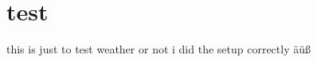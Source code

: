 \documentclass{article}
\begin{document}
%
%
%
\cleardoublepage
{}
\setcounter{page}{0}
\tableofcontents
\clearpage

%
%
%
\cleardoublepage
{}
\setcounter{page}{0}
\section{test}
this is just to test weather or not i did the setup correctly
äüß


 \cleardoublepage
 
\end{document}
